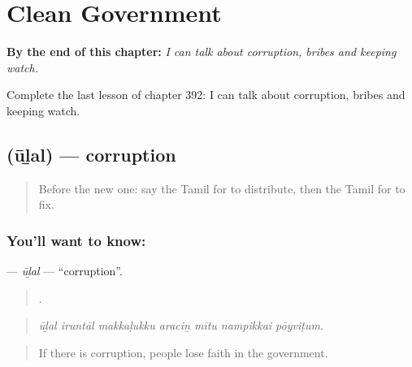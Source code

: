 
\chapter{Clean Government}
\label{ch:ta-clean-government}

\begin{chapteropening}
\textbf{By the end of this chapter:} \emph{I can talk about corruption, bribes and keeping watch.}

Complete the last lesson of chapter 392: I can talk about corruption, bribes and keeping watch.
\end{chapteropening}

\section[\texorpdfstring{\ta{ஊழல்} (ūḻal)}{ஊழல் (ūḻal)}]{ (ūḻal) — corruption}

\label{lesson:TA-C392-ulal}



\begin{quote}
Before the new one: say the Tamil for to distribute, then the Tamil for to fix.
\end{quote}

\subsection*{You'll want to know: }
\textbf{} — \emph{ūḻal} — \textquotedblleft{}corruption\textquotedblright{}.

\begin{quote}
      .
\end{quote}

\begin{quote}
\emph{ūḻal iruntāl makkaḷukku araciṉ mītu nampikkai pōyviṭum.}
\end{quote}

\begin{quote}
If there is corruption, people lose faith in the government.
\end{quote}

